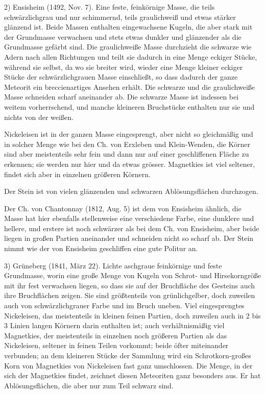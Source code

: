 \documentclass[a4paper, 11pt, oneside]{article}
\begin{document}
2) Ensisheim (1492, Nov. 7). Eine feste, feinkörnige Masse, die teils schwärzlichgrau und nur schimmernd, teils graulichweiß und etwas stärker glänzend ist. Beide Massen enthalten eingewachsene Kugeln, die aber stark mit der Grundmasse verwachsen und stets etwas dunkler und glänzender als die Grundmasse gefärbt sind. Die graulichweiße Masse durchzieht die schwarze wie Adern nach allen Richtungen und teilt sie dadurch in eine Menge eckiger Stücke, während sie selbst, da wo sie breiter wird, wieder eine Menge kleiner eckiger Stücke der schwärzlichgrauen Masse einschließt, so dass dadurch der ganze Meteorit ein breccienartiges Ansehen erhält. Die schwarze und die graulichweiße Masse schneiden scharf aneinander ab. Die schwarze Masse ist indessen bei weitem vorherrschend, und manche kleineren Bruchstücke enthalten nur sie und nichts von der weißen.

Nickeleisen ist in der ganzen Masse eingesprengt, aber nicht so gleichmäßig und in solcher Menge wie bei den Ch. von Erxleben und Klein-Wenden, die Körner sind aber meistenteils sehr fein und dann nur auf einer geschliffenen Fläche zu erkennen; sie werden nur hier und da etwas grösser. Magnetkies ist viel seltener, findet sich aber in einzelnen größeren Körnern.

Der Stein ist von vielen glänzenden und schwarzen Ablösungsflächen durchzogen.

Der Ch. von Chantonnay (1812, Aug. 5) ist dem von Ensisheim ähnlich, die Masse hat hier ebenfalls stellenweise eine verschiedene Farbe, eine dunklere und hellere, und erstere ist noch schwärzer als bei dem Ch. von Ensisheim, aber beide liegen in großen Partien aneinander und schneiden nicht so scharf ab. Der Stein nimmt wie der von Ensisheim geschliffen eine gute Politur an.

3) Grüneberg (1841, März 22). Lichte aschgraue feinkörnige und feste Grundmasse, worin eine große Menge von Kugeln von Schrot- und Hirsekorngröße mit ihr fest verwachsen liegen, so dass sie auf der Bruchfläche des Gesteins auch ihre Bruchflächen zeigen. Sie sind größtenteils von grünlichgelber, doch zuweilen auch von schwärzlichgrauer Farbe und im Bruch uneben. Viel eingesprengtes Nickeleisen, das meistenteils in kleinen feinen Partien, doch zuweilen auch in 2 bis 3 Linien langen Körnern darin enthalten ist; auch verhältnismäßig viel Magnetkies, der meistenteils in einzelnen noch größeren Partien als das Nickeleisen, seltener in feinen Teilen vorkommt; beide öfter miteinander verbunden; an dem kleineren Stücke der Sammlung wird ein Schrotkorn-großes Korn von Magnetkies von Nickeleisen fast ganz umschlossen. Die Menge, in der sich der Magnetkies findet, zeichnet diesen Meteoriten ganz besonders aus. Er hat Ablösungsflächen, die aber nur zum Teil schwarz sind.
\end{document}
